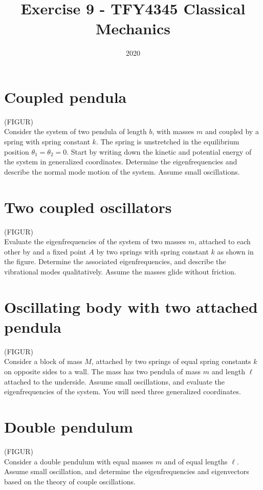 \documentclass{article}
\title{Exercise 9    - TFY4345 Classical Mechanics}
\date{2020}
\begin{document}
    \maketitle
    \section{Coupled pendula}
    (FIGUR) \\
    Consider the system of two pendula of length $b$, with masses $m$ and coupled by a spring with spring constant $k$. The spring is unstretched in the equilibrium position $\theta_1 = \theta_2 = 0$. Start by writing down the kinetic and potential energy of the system in generalized coordinates. Determine the eigenfrequencies and describe the normal mode motion of the system. Assume small oscillations.

    \section{Two coupled oscillators}
    (FIGUR) \\
    Evaluate the eigenfrequencies of the system of two masses $m$, attached to each other by and a fixed point $A$ by two springs with spring constant $k$ as shown in the figure. Determine the associated eigenfrequencies, and describe the vibrational modes qualitatively. Assume the masses glide without friction.

    \section{Oscillating body with two attached pendula}
    (FIGUR) \\
    Consider a block of mass $M$, attached by two springs of equal spring constants $k$ on opposite sides to a wall. The mass has two pendula of mass $m$ and length $\ell$ attached to the underside. Assume small oscillations, and evaluate the eigenfrequencies of the system. You will need three generalized coordinates.

    \section{Double pendulum}
    (FIGUR) \\
    Consider a double pendulum with equal masses $m$ and of equal lengths $\ell$. Assume small oscillation, and determine the eigenfrequencies and eigenvectors based on the theory of couple oscillations.
\end{document}
